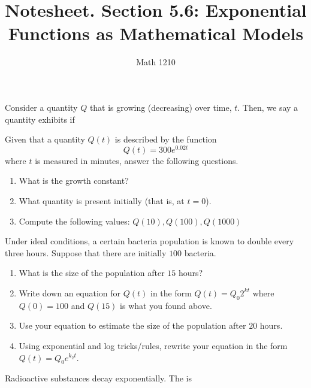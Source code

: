 \documentclass[12pt, a4paper]{article}
\author{Math 1210}
\title{Notesheet. Section 5.6: Exponential Functions as Mathematical Models}
\date{}
\begin{document}
\maketitle
\nameline
\begin{defi}
Consider a quantity \(Q\) that is growing (decreasing) over time,
\(t\). Then, we say a quantity exhibits  if
\end{defi}
\begin{ex}
  Given that a quantity \(Q(t)\) is described by the function \[
    Q(t) = 300 e^{0.02 t}
  \]
  where \(t\) is measured in minutes, answer the following questions.
  \begin{enumerate}
  \item What is the growth constant?
  \item What quantity is present initially (that is, at \(t=0\)).
  \item Compute the following values: \(Q(10), Q(100), Q(1000)\)
  \end{enumerate}
\end{ex}
\begin{ex}
  Under ideal conditions, a certain bacteria population is known to
  double every three hours. Suppose that there are initially \(100\)
  bacteria.
  \begin{enumerate}
  \item What is the size of the population after \(15\) hours?
    \vspace{0.75in}
  \item Write down an equation for \(Q(t)\) in the form \(Q(t) = Q_0
    2^{kt}\) where \(Q(0) = 100\) and \(Q(15)\) is what you found
    above.
    \vspace{0.75in}
  \item Use your equation to estimate the size of the population after
    \(20\) hours.
    \vspace{0.75in}
  \item Using exponential and log tricks/rules, rewrite your equation in the
    form \(Q(t) = Q_0 e^{k_2 t}\).
    \vspace{0.75in}
  \end{enumerate}
\end{ex}
\vspace{-2in}
\begin{defi}
  Radioactive substances decay exponentially. The  is
\end{defi}
\vspace{-0.5in}
\end{document}
